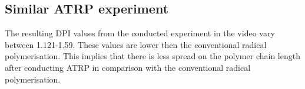 \subsection{Similar ATRP experiment}

    The resulting DPI values from the conducted experiment in the video vary between 1.121-1.59. 
    These values are lower then the conventional radical polymerisation. This implies that there is
    less spread on the polymer chain length after conducting ATRP in comparison with the conventional
    radical polymerisation.